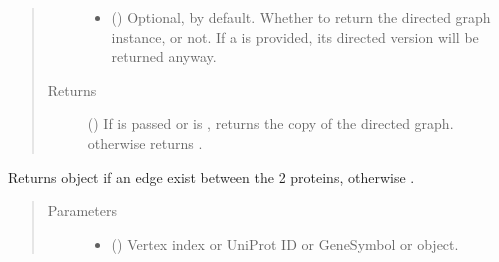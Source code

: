 \documentclass[letterpaper,10pt,english]{sphinxmanual}
\begin{document}
\begin{fulllineitems}
\begin{fulllineitems}
\begin{quote}
\begin{description}
\begin{itemize}
\item {} 
 () \textendash{} Optional,  by default. Whether to return the
directed graph instance, or not. If a  is provided,
its directed version will be returned anyway.

\end{itemize}

\item[{Returns}] \leavevmode
() \textendash{} If  is passed or  is
, returns the copy of the directed graph. otherwise
returns .

\end{description}\end{quote}

\end{fulllineitems}


\begin{fulllineitems}
\label{\detokenize{main:pypath.main.PyPath.get_dirs_signs}}
\end{fulllineitems}


\begin{fulllineitems}
\label{\detokenize{main:pypath.main.PyPath.get_edge}}
Returns  object if an edge exist between
the 2 proteins, otherwise .
\begin{quote}\begin{description}
\item[{Parameters}] \leavevmode\begin{itemize}
\item {} 
 (\sphinxstyleliteralemphasis{\sphinxupquote{,}}) \textendash{} Vertex index or UniProt ID or GeneSymbol or 
object.


\end{itemize}
\end{description}
\end{quote}
\end{fulllineitems}
\end{fulllineitems}
\end{document}
